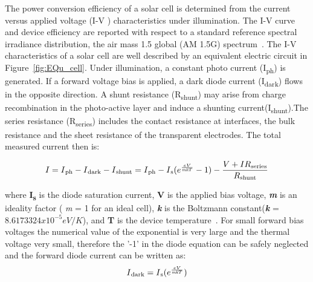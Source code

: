 The power conversion efficiency of a solar cell is determined from the current versus applied voltage (I-V ) characteristics under illumination. The I-V curve and device efficiency are reported with respect to a standard reference spectral irradiance distribution, the air mass 1.5 global (AM 1.5G) spectrum~\cite{wenger2010strategies}. The I-V characteristics of a solar cell are well described by an equivalent electric circuit in Figure~\ref{fig:EQu_cell}. Under illumination, a constant photo current (I\textsubscript{ph}) is generated. If a forward voltage bias is applied, a dark diode current (I\textsubscript{dark}) flows in the opposite direction. A shunt resistance (R\textsubscript{shunt}) may arise from charge recombination in the photo-active layer and induce a shunting current(I\textsubscript{shunt}).The series resistance (R\textsubscript{series}) includes the contact resistance at interfaces, the bulk resistance and the sheet resistance of the transparent electrodes. The total measured current then is:
 
 \begin{equation}
 \begin{aligned}
  I = I\textsubscript{ph} - I\textsubscript{dark} - I\textsubscript{shunt} = I\textsubscript{ph} -  I\textsubscript{s} (e^{\frac{eV}{\textit{mk}T}}-1) - \dfrac{V+IR\textsubscript{series}}{R\textsubscript{shunt}}
   \label{eq:equ_current}
   \end{aligned}
   \end{equation}

 where \textbf{I\textsubscript{s}} is the diode saturation current, \textbf{V} is the applied bias voltage, \textbf{\textit{m}} is an ideality factor ( \textit{m} = 1 for an ideal cell), \textbf{\textit{k}} is the Boltzmann constant(\textbf{\textit{k}} = $8.6173324 x 10^{-5} eV /K $), and \textbf{T} is the device temperature~\cite{wenger2010strategies}. For small forward bias voltages the numerical value of the exponential is very large and 
  the thermal voltage very small, therefore the '-1' in the diode equation can be safely neglected and the forward diode current can be written as\cite{pv_education_org}:
  \begin{equation}
   \begin{aligned}
    I\textsubscript{dark}= I\textsubscript{s} (e^{\frac{eV}{\textit{mk}T}}) 
    \label{eq:equ_current_dark}
    \end{aligned}
   \end{equation}
   

